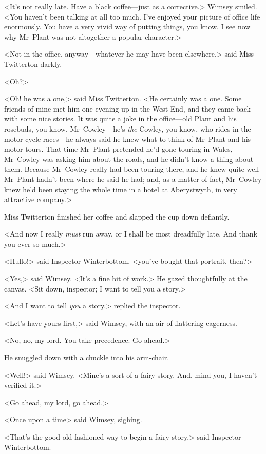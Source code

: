 <It's not really late. Have a black coffee—just as a corrective.> Wimsey smiled. <You haven't been talking at all too much. I've enjoyed your picture of office life enormously. You have a very vivid way of putting things, you know. I see now why Mr~Plant was not altogether a popular character.>

<Not in the office, anyway—whatever he may have been elsewhere,> said Miss Twitterton darkly.

<Oh?>

<Oh! he was a one,> said Miss Twitterton. <He certainly was a one. Some friends of mine met him one evening up in the West End, and they came back with some nice stories. It was quite a joke in the office—old Plant and his rosebuds, you know. Mr~Cowley—he's \textit{the} Cowley, you know, who rides in the motor-cycle races—he always said he knew what to think of Mr~Plant and his motor-tours. That time Mr~Plant pretended he'd gone touring in Wales, Mr~Cowley was asking him about the roads, and he didn't know a thing about them. Because Mr~Cowley really had been touring there, and he knew quite well Mr~Plant hadn't been where he said he had; and, as a matter of fact, Mr~Cowley knew he'd been staying the whole time in a hotel at Aberystwyth, in very attractive company.>

Miss Twitterton finished her coffee and slapped the cup down defiantly.

<And now I really \textit{must} run away, or I shall be most dreadfully late. And thank you ever so much.>

<Hullo!> said Inspector Winterbottom, <you've bought that portrait, then?>

<Yes,> said Wimsey. <It's a fine bit of work.> He gazed thoughtfully at the canvas. <Sit down, inspector; I want to tell you a story.>

<And I want to tell \textit{you} a story,> replied the inspector.

<Let's have yours first,> said Wimsey, with an air of flattering eagerness.

<No, no, my lord. You take precedence. Go ahead.>

He snuggled down with a chuckle into his arm-chair.

<Well!> said Wimsey. <Mine's a sort of a fairy-story. And, mind you, I haven't verified it.>

<Go ahead, my lord, go ahead.>

<Once upon a time\longdash> said Wimsey, sighing.

<That's the good old-fashioned way to begin a fairy-story,> said Inspector Winterbottom.

